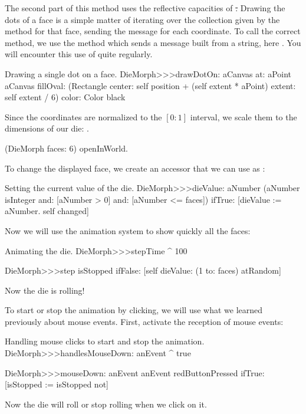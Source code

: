 \documentclass[a4paper,10pt,twoside]{book}
\begin{document}
The second part of this method uses the reflective capacities of \st.
Drawing the dots of a face is a simple matter of iterating over the collection given by the  method for that face, sending the  message for each coordinate. To call the correct  method, we use the  method which sends a message built from a string, here . You will encounter this use of  quite regularly.
\begin{method}{Drawing a single dot on a face.}
DieMorph>>>drawDotOn: aCanvas at: aPoint
	aCanvas
		fillOval: (Rectangle
			center: self position + (self extent * aPoint)
			extent: self extent / 6)
		color: Color black
\end{method}

Since the coordinates are normalized to the $[0{:}1]$ interval, we scale them to the dimensions of our die: .

\begin{code}{}
(DieMorph faces: 6) openInWorld.
\end{code}

To change the displayed face, we create an accessor that we can use as :
\begin{method}{Setting the current value of the die.}
DieMorph>>>dieValue: aNumber
	(aNumber isInteger
			and: [aNumber > 0]
			and: [aNumber <= faces])
		ifTrue:
			[dieValue := aNumber.
			self changed]
\end{method}

Now we will use the animation system to show quickly all the faces:
\begin{methods}{Animating the die.}
DieMorph>>>stepTime
	^ 100

DieMorph>>>step
	isStopped ifFalse: [self dieValue: (1 to: faces) atRandom]
\end{methods}
Now the die is rolling!

To start or stop the animation by clicking, we will use what we learned previously about mouse events.
First, activate the reception of mouse events:

\begin{methods}{Handling mouse clicks to start and stop the animation.}
DieMorph>>>handlesMouseDown: anEvent
	^ true

DieMorph>>>mouseDown: anEvent
	anEvent redButtonPressed
		ifTrue: [isStopped := isStopped not]
\end{methods}
Now the die will roll or stop rolling when we click on it.
\end{document}
